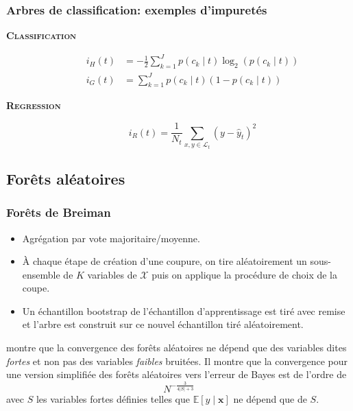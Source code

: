 \documentclass[dvipsnames,10pt]{beamer}
\theoremstyle{plain}
\theoremstyle{definition}
\begin{document}
\begin{frame}
\frametitle{Arbres de classification: exemples d'impuretés}
\begin{description}
    \item[\textbf{\textsc{Classification}}]
    \begin{align*}
        i_H (t) &= - \frac{1}{2} \sum_{k=1}^J p(c_k \mid t) \log_2 \left( p(c_k \mid t ) \right) \\
        i_G (t) &= \sum_{k=1}^J p\left(c_k \mid t \right) \left( 1-p(c_k \mid t) \right)
    \end{align*}
    \item[\textbf{\textsc{Regression}}]
    \begin{equation*}
        i_R (t) = \frac{1}{N_t} \sum_{x,y \in \mathcal{L}_t} (y-\hat{y}_t)^2
    \end{equation*}
\end{description}
\end{frame}

\subsection{Forêts aléatoires}

\begin{frame}
\frametitle{Forêts de Breiman}
\begin{itemize}
    \item Agrégation par vote majoritaire/moyenne.
    \item À chaque étape de création d'une coupure, on tire aléatoirement un sous-ensemble de $K$ variables de $\mathcal{X}$ puis on applique la procédure de choix de la coupe.
    \item Un échantillon bootstrap de l'échantillon d'apprentissage est tiré avec remise et l'arbre est construit sur ce nouvel échantillon tiré aléatoirement.
\end{itemize}

\cite{Breiman2004a} montre que la convergence des forêts aléatoires ne dépend que des variables dites \emph{fortes} et non pas des variables \emph{faibles} bruitées. Il montre que la convergence pour une version simplifiée des forêts aléatoires vers l'erreur de Bayes est de l'ordre de
\begin{equation*}
    N^{- \frac{3}{4 \vert S \vert + 3}}
\end{equation*}
avec $S$ les variables fortes définies telles que $\mathbb{E} \left[ y \mid \mathbf{x} \right]$ ne dépend que de $S$.
\end{frame}
\end{document}
